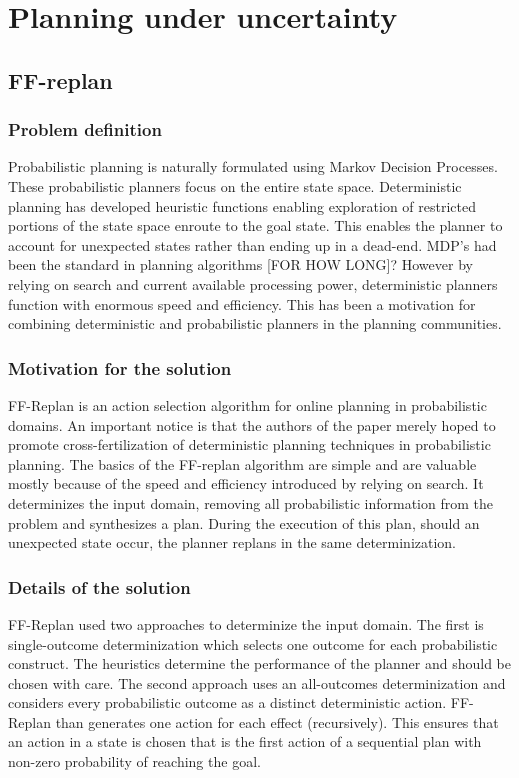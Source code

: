\documentclass[runningheads,a4paper]{llncs}
\begin{document}
\section{Planning under uncertainty}

\subsection{FF-replan \cite{FFReplan}}

\subsubsection{Problem definition}
Probabilistic planning is naturally formulated using Markov Decision Processes. These probabilistic planners focus on the entire state space. Deterministic planning has developed heuristic functions enabling exploration of restricted portions of the state space enroute to the goal state. This enables the planner to account for unexpected states rather than ending up in a dead-end. MDP's had been the standard in planning algorithms [FOR HOW LONG]? However by relying on search and current available processing power, deterministic planners function with enormous speed and efficiency. This has been a motivation for combining deterministic and probabilistic planners in the planning communities.

\subsubsection{Motivation for the solution}
FF-Replan is an action selection algorithm for online planning in probabilistic domains. An important notice is that the authors of the paper merely hoped to promote cross-fertilization of deterministic planning techniques in probabilistic planning. The basics of the FF-replan algorithm are simple and are valuable mostly because of the speed and efficiency introduced by relying on search.  It determinizes the input domain, removing all probabilistic information from the problem and synthesizes a plan. During the execution of this plan, should an unexpected state occur, the planner replans in the same determinization.

\subsubsection{Details of the solution}
FF-Replan used two approaches to determinize the input domain. The first is single-outcome determinization which selects one outcome for each probabilistic construct. The heuristics determine the performance of the planner and should be chosen with care. The second approach uses an all-outcomes determinization and considers every probabilistic outcome as a distinct deterministic action. FF-Replan than generates one action for each effect (recursively). This ensures that an action in a state is chosen that is the first action of a sequential plan with non-zero probability of reaching the goal.
\end{document}
